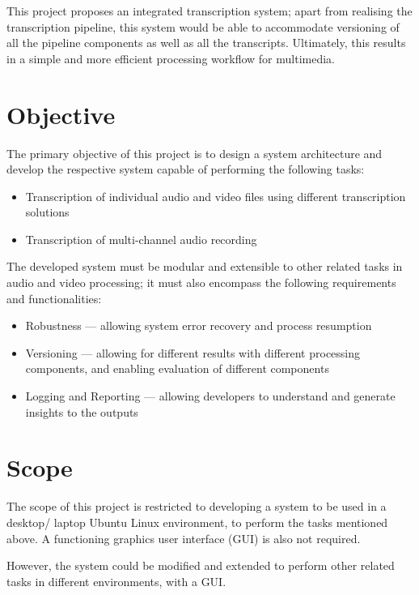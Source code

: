 This project proposes an integrated transcription system; apart from realising
the transcription pipeline, this system would be able to accommodate versioning
of all the pipeline components as well as all the transcripts. Ultimately, this
results in a simple and more efficient processing workflow for multimedia.

\section{Objective}

The primary objective of this project is to design a system architecture and
develop the respective system capable of performing the following tasks:

\begin{itemize}
    \item Transcription of individual audio and video files using different
    transcription solutions
    \item Transcription of multi-channel audio recording
\end{itemize}

The developed system must be modular and extensible to other related tasks
in audio and video processing; it must also encompass the following requirements
and functionalities:

\begin{itemize}
    \item Robustness --- allowing system error recovery and process resumption
    \item Versioning --- allowing for different results with different processing
    components, and enabling evaluation of different components
    \item Logging and Reporting --- allowing developers to understand and generate
    insights to the outputs
\end{itemize}

\section{Scope}

The scope of this project is restricted to developing a system to be used in a
desktop/ laptop Ubuntu Linux environment, to perform the tasks mentioned above. A
functioning graphics user interface (GUI) is also not required.

However, the system could be modified and extended to perform other related tasks
in different environments, with a GUI\@.

